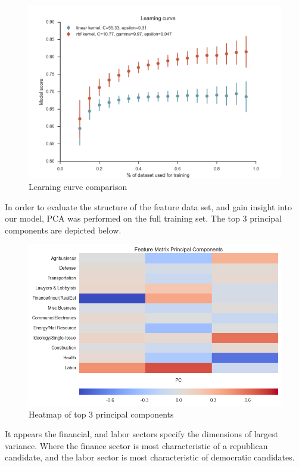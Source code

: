 \documentclass[12]{article}
\begin{document}
\begin{figure}[H]
\begin{center}
\includegraphics[width=0.8\linewidth]{learning_curve.png}
\caption{Learning curve comparison}
\end{center}
\end{figure}

In order to evaluate the structure of the feature data set, and gain insight
into our model, PCA was performed on the full training set.  The top 3
principal components are depicted below.  

\begin{figure}[H]
\centering
\includegraphics[width=.8\textwidth]{cand_2010_2012_2014_fm_trim_normed_pc_hm.png}
\caption{\label{fig:pc_all}Heatmap of top 3 principal components}
\end{figure}

It appears the financial, and labor sectors specify the dimensions of largest
variance. Where the finance sector is most characteristic of a republican
candidate, and the labor sector is most characteristic of democratic candidates.

\end{document}
